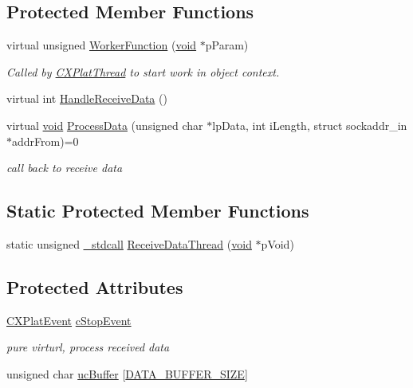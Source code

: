 \subsection*{\-Protected \-Member \-Functions}
\begin{DoxyCompactItemize}
\item 
virtual unsigned \hyperlink{class_c_u_d_p_socket_ab33c06fd2594ab658f8addbb1a4944aa}{\-Worker\-Function} (\hyperlink{_cpclient_8h_a6464f7480a0fd0ee170cba12b2c0497f}{void} $\ast$p\-Param)
\begin{DoxyCompactList}\small\item\em \-Called by \hyperlink{class_c_x_plat_thread}{\-C\-X\-Plat\-Thread} to start work in object context. \end{DoxyCompactList}\item 
virtual int \hyperlink{class_c_u_d_p_socket_a6e809eadb40d97b4991f3e6b21fd3b87}{\-Handle\-Receive\-Data} ()
\item 
virtual \hyperlink{_cpclient_8h_a6464f7480a0fd0ee170cba12b2c0497f}{void} \hyperlink{class_c_u_d_p_socket_ab31aee7d247dad588476c2203ad84d18}{\-Process\-Data} (unsigned char $\ast$lp\-Data, int i\-Length, struct sockaddr\-\_\-in $\ast$addr\-From)=0
\begin{DoxyCompactList}\small\item\em call back to receive data \end{DoxyCompactList}\end{DoxyCompactItemize}
\subsection*{\-Static \-Protected \-Member \-Functions}
\begin{DoxyCompactItemize}
\item 
static unsigned \hyperlink{_x_plat_8h_a3107b1d0ca10d4ae4575d9107d4cbffe}{\-\_\-stdcall} \hyperlink{class_c_u_d_p_socket_a62fafcc570b0df054ad766171cd976bd}{\-Receive\-Data\-Thread} (\hyperlink{_cpclient_8h_a6464f7480a0fd0ee170cba12b2c0497f}{void} $\ast$p\-Void)
\end{DoxyCompactItemize}
\subsection*{\-Protected \-Attributes}
\begin{DoxyCompactItemize}
\item 
\hyperlink{class_c_x_plat_event}{\-C\-X\-Plat\-Event} \hyperlink{class_c_u_d_p_socket_abded5c32659597c7090dba34bbf3320f}{c\-Stop\-Event}
\begin{DoxyCompactList}\small\item\em pure virturl, process received data \end{DoxyCompactList}\item 
unsigned char \hyperlink{class_c_u_d_p_socket_adba8b62f17aa86ca7d6dc7514a998d8b}{uc\-Buffer} \mbox{[}\hyperlink{class_c_u_d_p_socket_a47208bbacf51eb5dcf13676e275b74faac90ae17c9b44fb66c6dd1c532e67c1e0}{\-D\-A\-T\-A\-\_\-\-B\-U\-F\-F\-E\-R\-\_\-\-S\-I\-Z\-E}\mbox{]}
\end{DoxyCompactItemize}


